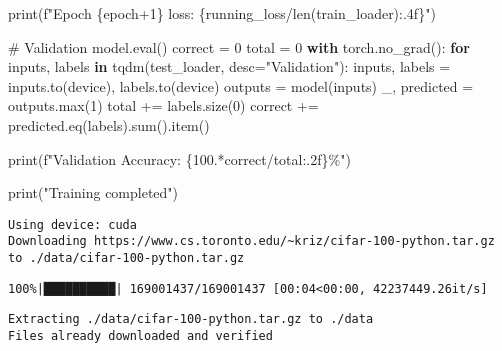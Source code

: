 \documentclass[
  letterpaper,
  DIV=11,
  numbers=noendperiod]{scrreprt}
\newenvironment{Shaded}{\begin{snugshade}}{\end{snugshade}}
\newcommand{\BuiltInTok}[1]{\textcolor[rgb]{0.00,0.23,0.31}{#1}}
\newcommand{\CommentTok}[1]{\textcolor[rgb]{0.37,0.37,0.37}{#1}}
\newcommand{\ControlFlowTok}[1]{\textcolor[rgb]{0.00,0.23,0.31}{\textbf{#1}}}
\newcommand{\DecValTok}[1]{\textcolor[rgb]{0.68,0.00,0.00}{#1}}
\newcommand{\FloatTok}[1]{\textcolor[rgb]{0.68,0.00,0.00}{#1}}
\newcommand{\KeywordTok}[1]{\textcolor[rgb]{0.00,0.23,0.31}{\textbf{#1}}}
\newcommand{\NormalTok}[1]{\textcolor[rgb]{0.00,0.23,0.31}{#1}}
\newcommand{\OperatorTok}[1]{\textcolor[rgb]{0.37,0.37,0.37}{#1}}
\newcommand{\SpecialCharTok}[1]{\textcolor[rgb]{0.37,0.37,0.37}{#1}}
\newcommand{\SpecialStringTok}[1]{\textcolor[rgb]{0.13,0.47,0.30}{#1}}
\newcommand{\StringTok}[1]{\textcolor[rgb]{0.13,0.47,0.30}{#1}}
\begin{document}
\begin{Shaded}
\begin{Highlighting}[]
    \BuiltInTok{print}\NormalTok{(}\SpecialStringTok{f"Epoch }\SpecialCharTok{\{}\NormalTok{epoch}\OperatorTok{+}\DecValTok{1}\SpecialCharTok{\}}\SpecialStringTok{ loss: }\SpecialCharTok{\{}\NormalTok{running\_loss}\OperatorTok{/}\BuiltInTok{len}\NormalTok{(train\_loader)}\SpecialCharTok{:.4f\}}\SpecialStringTok{"}\NormalTok{)}

    \CommentTok{\# Validation}
\NormalTok{    model.}\BuiltInTok{eval}\NormalTok{()}
\NormalTok{    correct }\OperatorTok{=} \DecValTok{0}
\NormalTok{    total }\OperatorTok{=} \DecValTok{0}
    \ControlFlowTok{with}\NormalTok{ torch.no\_grad():}
        \ControlFlowTok{for}\NormalTok{ inputs, labels }\KeywordTok{in}\NormalTok{ tqdm(test\_loader, desc}\OperatorTok{=}\StringTok{"Validation"}\NormalTok{):}
\NormalTok{            inputs, labels }\OperatorTok{=}\NormalTok{ inputs.to(device), labels.to(device)}
\NormalTok{            outputs }\OperatorTok{=}\NormalTok{ model(inputs)}
\NormalTok{            \_, predicted }\OperatorTok{=}\NormalTok{ outputs.}\BuiltInTok{max}\NormalTok{(}\DecValTok{1}\NormalTok{)}
\NormalTok{            total }\OperatorTok{+=}\NormalTok{ labels.size(}\DecValTok{0}\NormalTok{)}
\NormalTok{            correct }\OperatorTok{+=}\NormalTok{ predicted.eq(labels).}\BuiltInTok{sum}\NormalTok{().item()}

    \BuiltInTok{print}\NormalTok{(}\SpecialStringTok{f"Validation Accuracy: }\SpecialCharTok{\{}\FloatTok{100.}\OperatorTok{*}\NormalTok{correct}\OperatorTok{/}\NormalTok{total}\SpecialCharTok{:.2f\}}\SpecialStringTok{\%"}\NormalTok{)}

\BuiltInTok{print}\NormalTok{(}\StringTok{"Training completed"}\NormalTok{)}

\end{Highlighting}
\end{Shaded}

\begin{verbatim}
Using device: cuda
Downloading https://www.cs.toronto.edu/~kriz/cifar-100-python.tar.gz to ./data/cifar-100-python.tar.gz
\end{verbatim}

\begin{verbatim}
100%|██████████| 169001437/169001437 [00:04<00:00, 42237449.26it/s]
\end{verbatim}

\begin{verbatim}
Extracting ./data/cifar-100-python.tar.gz to ./data
Files already downloaded and verified
\end{verbatim}
\end{document}
